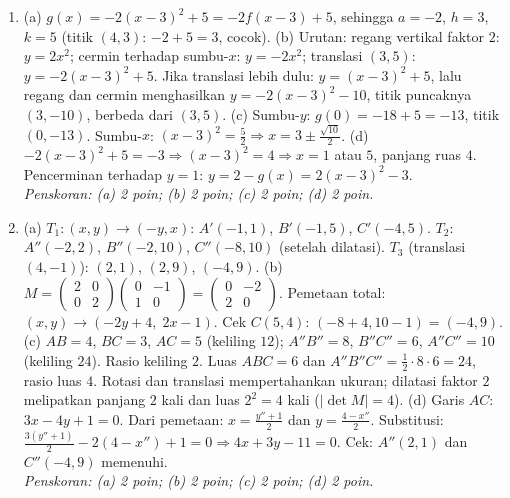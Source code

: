 \documentclass[a4paper,11pt]{article}
\begin{document}
\small\begin{enumerate}[leftmargin=2em,itemsep=3pt,topsep=2pt]
\item[\textbf{1.}] (a) $g(x)=-2(x-3)^2+5=-2f(x-3)+5$, sehingga $a=-2$, $h=3$, $k=5$ (titik $(4,3)$: $-2+5=3$, cocok). (b) Urutan: regang vertikal faktor $2$: $y=2x^2$; cermin terhadap sumbu-$x$: $y=-2x^2$; translasi $(3,5)$: $y=-2(x-3)^2+5$. Jika translasi lebih dulu: $y=(x-3)^2+5$, lalu regang dan cermin menghasilkan $y=-2(x-3)^2-10$, titik puncaknya $(3,-10)$, berbeda dari $(3,5)$. (c) Sumbu-$y$: $g(0)=-18+5=-13$, titik $(0,-13)$. Sumbu-$x$: $(x-3)^2=\frac52\Rightarrow x=3\pm\frac{\sqrt{10}}2$. (d) $-2(x-3)^2+5=-3\Rightarrow(x-3)^2=4\Rightarrow x=1$ atau $5$, panjang ruas $4$. Pencerminan terhadap $y=1$: $y=2-g(x)=2(x-3)^2-3$. \\ \textit{Penskoran: (a) 2 poin; (b) 2 poin; (c) 2 poin; (d) 2 poin.}
\item[\textbf{2.}] (a) $T_1:(x,y)\to(-y,x)$: $A'(-1,1)$, $B'(-1,5)$, $C'(-4,5)$. $T_2$: $A''(-2,2)$, $B''(-2,10)$, $C''(-8,10)$ (setelah dilatasi). $T_3$ (translasi $(4,-1)$): $(2,1)$, $(2,9)$, $(-4,9)$. (b) $M=\begin{pmatrix}2&0\\0&2\end{pmatrix}\begin{pmatrix}0&-1\\1&0\end{pmatrix}=\begin{pmatrix}0&-2\\2&0\end{pmatrix}$. Pemetaan total: $(x,y)\to(-2y+4,\;2x-1)$. Cek $C(5,4)$: $(-8+4,10-1)=(-4,9)$. (c) $AB=4$, $BC=3$, $AC=5$ (keliling $12$); $A''B''=8$, $B''C''=6$, $A''C''=10$ (keliling $24$). Rasio keliling $2$. Luas $ABC=6$ dan $A''B''C''=\frac12\cdot8\cdot6=24$, rasio luas $4$. Rotasi dan translasi mempertahankan ukuran; dilatasi faktor $2$ melipatkan panjang $2$ kali dan luas $2^2=4$ kali ($|\det M|=4$). (d) Garis $AC$: $3x-4y+1=0$. Dari pemetaan: $x=\frac{y''+1}2$ dan $y=\frac{4-x''}2$. Substitusi: $\frac{3(y''+1)}2-2(4-x'')+1=0\Rightarrow4x+3y-11=0$. Cek: $A''(2,1)$ dan $C''(-4,9)$ memenuhi. \\ \textit{Penskoran: (a) 2 poin; (b) 2 poin; (c) 2 poin; (d) 2 poin.}

\end{enumerate}
\end{document}
